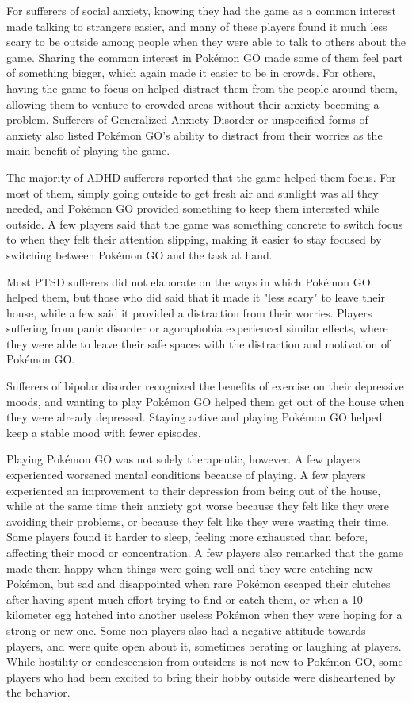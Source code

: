 For sufferers of social anxiety, knowing they had the game as a common interest made talking to strangers easier, and many of these players found it much less scary to be outside among people when they were able to talk to others about the game. Sharing the common interest in Pokémon GO made some of them feel part of something bigger, which again made it easier to be in crowds. For others, having the game to focus on helped distract them from the people around them, allowing them to venture to crowded areas without their anxiety becoming a problem. Sufferers of Generalized Anxiety Disorder or unspecified forms of anxiety also listed Pokémon GO's ability to distract from their worries as the main benefit of playing the game.

The majority of ADHD sufferers reported that the game helped them focus. For most of them, simply going outside to get fresh air and sunlight was all they needed, and Pokémon GO provided something to keep them interested while outside. A few players said that the game was something concrete to switch focus to when they felt their attention slipping, making it easier to stay focused by switching between Pokémon GO and the task at hand.

Most PTSD sufferers did not elaborate on the ways in which Pokémon GO helped them, but those who did said that it made it "less scary" to leave their house, while a few said it provided a distraction from their worries. Players suffering from panic disorder or agoraphobia experienced similar effects, where they were able to leave their safe spaces with the distraction and motivation of Pokémon GO.

Sufferers of bipolar disorder recognized the benefits of exercise on their depressive moods, and wanting to play Pokémon GO helped them get out of the house when they were already depressed. Staying active and playing Pokémon GO helped keep a stable mood with fewer episodes.

Playing Pokémon GO was not solely therapeutic, however. A few players experienced worsened mental conditions because of playing. A few players experienced an improvement to their depression from being out of the house, while at the same time their anxiety got worse because they felt like they were avoiding their problems, or because they felt like they were wasting their time. Some players found it harder to sleep, feeling more exhausted than before, affecting their mood or concentration. A few players also remarked that the game made them happy when things were going well and they were catching new Pokémon, but sad and disappointed when rare Pokémon escaped their clutches after having spent much effort trying to find or catch them, or when a 10 kilometer egg hatched into another useless Pokémon when they were hoping for a strong or new one. Some non-players also had a negative attitude towards players, and were quite open about it, sometimes berating or laughing at players. While hostility or condescension from outsiders is not new to Pokémon GO, some players who had been excited to bring their hobby outside were disheartened by the behavior.
